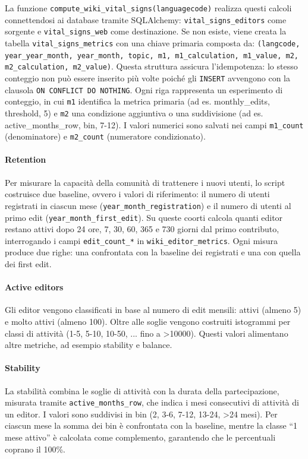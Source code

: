 La funzione \texttt{compute\_wiki\_vital\_signs(languagecode)} realizza questi calcoli connettendosi ai database tramite SQLAlchemy: 
\texttt{vital\_signs\_editors} come sorgente e \texttt{vital\_signs\_web} come destinazione. 
Se non esiste, viene creata la tabella \texttt{vital\_signs\_metrics} con una chiave primaria composta da: 
\texttt{(langcode, year\_year\_month, year\_month, topic, m1, m1\_calculation, m1\_value, m2, \\m2\_calculation, m2\_value)}. Questa struttura assicura l’idempotenza: lo stesso conteggio non può essere inserito più volte poiché gli \texttt{INSERT} avvengono con la clausola \texttt{ON CONFLICT DO NOTHING}. 
Ogni riga rappresenta un esperimento di conteggio, in cui \texttt{m1} identifica la metrica primaria (ad es. monthly\_edits, threshold, 5) e \texttt{m2} una condizione aggiuntiva o una suddivisione (ad es. active\_months\_row, bin, 7-12). I valori numerici sono salvati nei campi \texttt{m1\_count} (denominatore) e \texttt{m2\_count} (numeratore condizionato).

\paragraph{Retention}  
Per misurare la capacità della comunità di trattenere i nuovi utenti, lo script costruisce due baseline, ovvero i valori di riferimento: il numero di utenti registrati in ciascun mese (\texttt{year\_month\allowbreak\_registration}) e il numero di utenti al primo edit (\texttt{year\_month\_first\_edit}). 
Su queste coorti calcola quanti editor restano attivi dopo 24 ore, 7, 30, 60, 365 e 730 giorni dal primo contributo, interrogando i campi \texttt{edit\_count\_*} in \texttt{wiki\_editor\_metrics}. 
Ogni misura produce due righe: una confrontata con la baseline dei registrati e una con quella dei first edit.

\paragraph{Active editors}  
Gli editor vengono classificati in base al numero di edit mensili: attivi (almeno 5) e molto attivi (almeno 100). 
Oltre alle soglie vengono costruiti istogrammi per classi di attività (1-5, 5-10, 10-50, ... fino a \textgreater 10000). 
Questi valori alimentano altre metriche, ad esempio stability e balance.

\paragraph{Stability}  
La stabilità combina le soglie di attività con la durata della partecipazione, misurata tramite \texttt{active\_months\_row}, che indica i mesi consecutivi di attività di un editor. 
I valori sono suddivisi in bin (2, 3-6, 7-12, 13-24, \textgreater 24 mesi). 
Per ciascun mese la somma dei bin è confrontata con la baseline, mentre la classe ``1 mese attivo'' è calcolata come complemento, garantendo che le percentuali coprano il 100\%.

